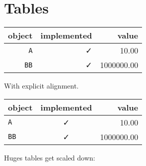 \section{Tables}



\label{6147076236960597988}{}



\begin{table}[h]

\begin{tabulary}{\linewidth}{|R|R|R|}
\hline
object & implemented & value \\
\hline
\texttt{A} & ✓ & 10.00 \\
\hline
\texttt{BB} & ✓ & 1000000.00 \\
\hline
\end{tabulary}

\end{table}



With explicit alignment.




\begin{table}[h]

\begin{tabulary}{\linewidth}{|L|C|R|}
\hline
object & implemented & value \\
\hline
\texttt{A} & ✓ & 10.00 \\
\hline
\texttt{BB} & ✓ & 1000000.00 \\
\hline
\end{tabulary}

\end{table}



Huges tables get scaled down:




